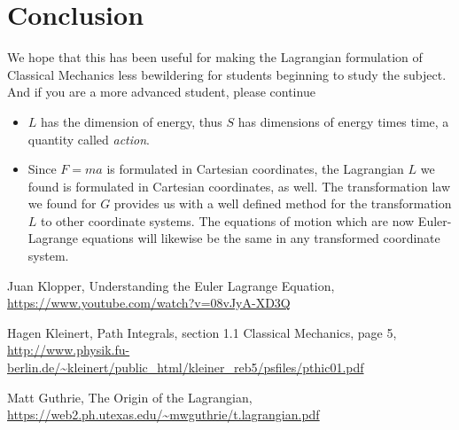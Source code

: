 \documentclass{article}
\begin{document}
\section{Conclusion}

We hope that this has been useful for making the Lagrangian formulation of Classical Mechanics less bewildering for students beginning to study the subject. And if you are a more advanced student, please continue

\begin{itemize}
\item $L$ has the dimension of energy, thus $S$ has dimensions of energy times time, a quantity called \emph{action}.
\item Since $F=ma$ is formulated in Cartesian coordinates, the Lagrangian $L$ we found is formulated in Cartesian coordinates, as well. The transformation law we found for $G$ provides us with a well defined method for the transformation $L$ to other coordinate systems. The equations of motion which are now Euler-Lagrange equations will likewise be the same in any transformed coordinate system.
\end{itemize}


\begin{thebibliography}{9}

 Juan Klopper, Understanding the Euler Lagrange Equation, \url{https://www.youtube.com/watch?v=08vJyA-XD3Q}

 Hagen Kleinert, Path Integrals, section 1.1 Classical Mechanics, page 5, \url{http://www.physik.fu-berlin.de/~kleinert/public_html/kleiner_reb5/psfiles/pthic01.pdf}

 Matt Guthrie, The Origin of the Lagrangian, \url{https://web2.ph.utexas.edu/~mwguthrie/t.lagrangian.pdf}

\end{thebibliography}
\end{document}

